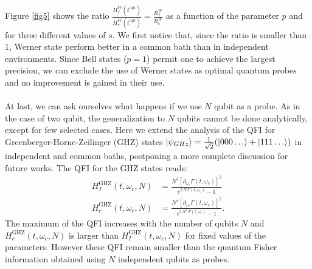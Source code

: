 \documentclass[ pra,a4paper,aps,twocolumn,superscriptaddress]{revtex4-1}
\def\ket#1{\mathinner{|{#1}\rangle}}
\def\tc#1{{\color{black}#1}}
\begin{document}
\tc{
Figure \ref{fig5} shows the ratio $\frac{H^W_I(t^{\text{opt}})}{H^W_c(t^{\text{opt}})}=\frac{R_I^W}{R_c^W}$ as a function of the parameter $p$ and for three different values of $s$.  We first notice that, since the ratio is smaller than 1, Werner state  perform better in a common bath than in independent environments. Since Bell states ($p=1$) permit one to achieve the largest precision, we can exclude the use of Werner states as optimal quantum probes and no improvement is gained in their use.
\\
\\
At last, we can ask ourselves what happens if we use $N$ qubit as a probe. 
As in the case of two qubit, the generalization to $N$ qubits cannot be done analytically, except for few selected cases.
Here we extend the analysis of the QFI for Greenberger-Horne-Zeilinger (GHZ) states $\ket{\psi_{GHz}}=\frac{1}{\sqrt{2}}(\ket{000\dots}+\ket{111\dots})$ in independent and common baths, postponing a more complete discussion for future works. The QFI for the GHZ states reads:
\begin{align}
H_I^{\text{GHZ}}(t,\omega_c,N)&=\frac{N^2 [\partial_{\omega_c}\Gamma(t,\omega_c)]^2}{e^{2 \,N\, \Gamma(t,\omega_c)}-1}\\
H_c^{\text{GHZ}}(t,\omega_c,N)&=\frac{N^4 [\partial_{\omega_c}\Gamma(t,\omega_c)]^2}{e^{2 \,N^2\, \Gamma(t,\omega_c)}-1}.
\end{align}
The maximum of the QFI increases with the number of qubits $N$ and $H_c^{\text{GHZ}}(t,\omega_c,N)$ is larger than $H_I^{\text{GHZ}}(t,\omega_c,N)$ for fixed values of the parameters. However these QFI remain smaller than the quantum Fisher information obtained using $N$ independent qubits as probes.
}
%
\end{document}
